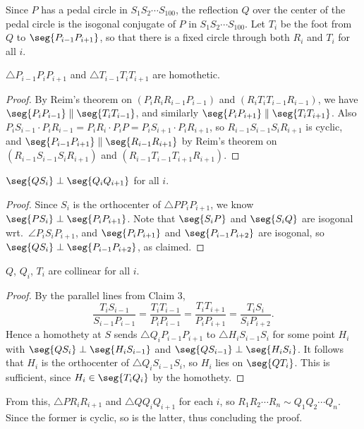Since $P$ has a pedal circle in $S_1S_2\cdots S_{100}$, the reflection $Q$ over the center of the pedal circle is the isogonal conjugate of $P$ in $S_1S_2\cdots S_{100}$. Let $T_i$ be the foot from $Q$ to $\seg{P_{i-1}P_{i+1}}$, so that there is a fixed circle through both $R_i$ and $T_i$ for all $i$.
\begin{claim}
    $\triangle P_{i-1}P_iP_{i+1}$ and $\triangle T_{i-1}T_iT_{i+1}$ are homothetic.
\end{claim}
\begin{proof}
    By Reim's theorem on $(P_iR_iR_{i-1}P_{i-1})$ and $(R_iT_iT_{i-1}R_{i-1})$, we have $\seg{P_iP_{i-1}}\parallel\seg{T_iT_{i-1}}$, and similarly $\seg{P_iP_{i+1}}\parallel\seg{T_iT_{i+1}}$. Also $P_iS_{i-1}\cdot P_iR_{i-1}=P_iR_i\cdot P_iP=P_iS_{i+1}\cdot P_iR_{i+1}$, so $R_{i-1}S_{i-1}S_iR_{i+1}$ is cyclic, and $\seg{P_{i-1}P_{i+1}}\parallel\seg{R_{i-1}R_{i+1}}$ by Reim's theorem on $(R_{i-1}S_{i-1}S_iR_{i+1})$ and $(R_{i-1}T_{i-1}T_{i+1}R_{i+1})$.
\end{proof}
\begin{claim}
    $\seg{QS_i}\perp\seg{Q_iQ_{i+1}}$ for all $i$.
\end{claim}
\begin{proof}
    Since $S_i$ is the orthocenter of $\triangle PP_iP_{i+1}$, we know $\seg{PS_i}\perp\seg{P_iP_{i+1}}$. Note that $\seg{S_iP}$ and $\seg{S_iQ}$ are isogonal wrt.\ $\angle P_iS_iP_{i+1}$, and $\seg{P_iP_{i+1}}$ and $\seg{P_{i-1}P_{i+2}}$ are isogonal, so $\seg{QS_i}\perp\seg{P_{i-1}P_{i+2}}$, as claimed.
\end{proof}
\begin{claim}
    $Q$, $Q_i$, $T_i$ are collinear for all $i$.
\end{claim}
\begin{proof}
    By the parallel lines from Claim 3, \[\frac{T_iS_{i-1}}{S_{i-1}P_{i-1}}=\frac{T_iT_{i-1}}{P_iP_{i-1}}=\frac{T_iT_{i+1}}{P_iP_{i+1}}=\frac{T_iS_i}{S_iP_{i+2}}.\]
    Hence a homothety at $S$ sends $\triangle Q_iP_{i-1}P_{i+1}$ to $\triangle H_iS_{i-1}S_i$ for some point $H_i$ with $\seg{QS_i}\perp\seg{H_iS_{i-1}}$ and $\seg{QS_{i-1}}\perp\seg{H_iS_i}$. It follows that $H_i$ is the orthocenter of $\triangle Q_iS_{i-1}S_i$, so $H_i$ lies on $\seg{QT_i}$. This is sufficient, since $H_i\in\seg{T_iQ_i}$ by the homothety.
\end{proof}

From this, $\triangle PR_iR_{i+1}$ and $\triangle QQ_iQ_{i+1}$ for each $i$, so $R_1R_2\cdots R_n\sim Q_1Q_2\cdots Q_n$. Since the former is cyclic, so is the latter, thus concluding the proof.
